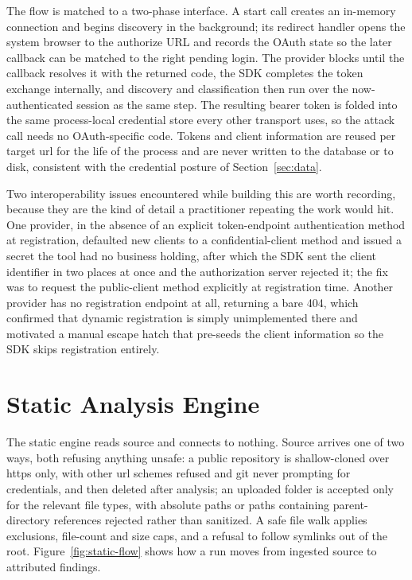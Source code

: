 The flow is matched to a two-phase interface. A start call creates an in-memory connection and begins discovery in the background; its redirect handler opens the system browser to the authorize URL and records the OAuth state so the later callback can be matched to the right pending login. The provider blocks until the callback resolves it with the returned code, the SDK completes the token exchange internally, and discovery and classification then run over the now-authenticated session as the same step. The resulting bearer token is folded into the same process-local credential store every other transport uses, so the attack call needs no OAuth-specific code. Tokens and client information are reused per target \acrshort{url} for the life of the process and are never written to the database or to disk, consistent with the credential posture of Section~\ref{sec:data}.

Two interoperability issues encountered while building this are worth recording, because they are the kind of detail a practitioner repeating the work would hit. One provider, in the absence of an explicit token-endpoint authentication method at registration, defaulted new clients to a confidential-client method and issued a secret the tool had no business holding, after which the SDK sent the client identifier in two places at once and the authorization server rejected it; the fix was to request the public-client method explicitly at registration time. Another provider has no registration endpoint at all, returning a bare 404, which confirmed that dynamic registration is simply unimplemented there and motivated a manual escape hatch that pre-seeds the client information so the SDK skips registration entirely.

\section{Static Analysis Engine}
\label{sec:static-impl}

The static engine reads source and connects to nothing. Source arrives one of two ways, both refusing anything unsafe: a public repository is shallow-cloned over \gls{https} only, with other \acrshort{url} schemes refused and git never prompting for credentials, and then deleted after analysis; an uploaded folder is accepted only for the relevant file types, with absolute paths or paths containing parent-directory references rejected rather than sanitized. A safe file walk applies exclusions, file-count and size caps, and a refusal to follow symlinks out of the root. Figure~\ref{fig:static-flow} shows how a run moves from ingested source to attributed findings.

